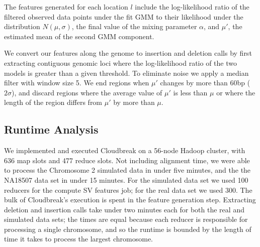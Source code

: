 \documentclass[11pt]{article}
\begin{document}
\begin{description}
The features generated for each location $l$ include the log-likelihood ratio of the filtered observed data points under the fit GMM to their likelihood under the distribution $N(\mu,\sigma)$, the final value of the mixing parameter $\alpha$, and $\mu'$, the estimated mean of the second GMM component.

\item[\sc{PostProcess}] We convert our features along the genome to insertion and deletion calls by first extracting contiguous genomic loci where the log-likelihood ratio of the two models is greater than a given threshold. To eliminate noise we apply a median filter with window size 5. We end regions when $\mu'$ changes by more than 60bp ($2\sigma$), and discard regions where the average value of $\mu'$ is less than $\mu$ or where the length of the region differs from $\mu'$ by more than $\mu$.
\end{description}

\subsection{Runtime Analysis}

We implemented and executed Cloudbreak on a 56-node Hadoop cluster, with 636 map slots and 477 reduce slots. Not including alignment time, we were able to process the Chromosome 2 simulated data in under five minutes, and the the NA18507 data set in under 15 minutes. For the simulated data set we used 100 reducers for the compute SV features job; for the real data set we used 300. The bulk of Cloudbreak's execution is spent in the feature generation step. Extracting deletion and insertion calls take under two minutes each for both the real and simulated data sets; the times are equal because each reducer is responsible for processing a single chromosome, and so the runtime is bounded by the length of time it takes to process the largest chromosome. 
\end{document}
